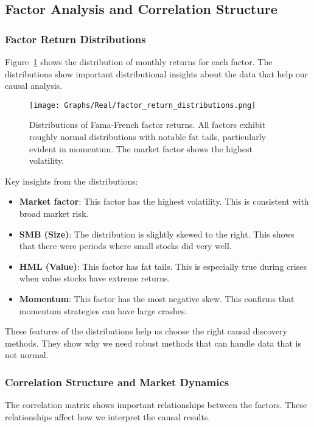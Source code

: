 \subsection{Factor Analysis and Correlation Structure}

\subsubsection{Factor Return Distributions}

Figure~\ref{fig:factor_dist_real} shows the distribution of monthly returns for each factor. The distributions show important distributional insights about the data that help our causal analysis.

\begin{figure}[ht]
\centering
\texttt{[image: Graphs/Real/factor\_return\_distributions.png]}
\caption{Distributions of Fama-French factor returns. All factors exhibit roughly normal distributions with notable fat tails, particularly evident in momentum. The market factor shows the highest volatility.}
\label{fig:factor_dist_real}
\end{figure}

Key insights from the distributions:
\begin{itemize}
    \item \textbf{Market factor}: This factor has the highest volatility. This is consistent with broad market risk.
    \item \textbf{SMB (Size)}: The distribution is slightly skewed to the right. This shows that there were periods where small stocks did very well.
    \item \textbf{HML (Value)}: This factor has fat tails. This is especially true during crises when value stocks have extreme returns.
    \item \textbf{Momentum}: This factor has the most negative skew. This confirms that momentum strategies can have large crashes.
\end{itemize}

These features of the distributions help us choose the right causal discovery methods. They show why we need robust methods that can handle data that is not normal.

\subsubsection{Correlation Structure and Market Dynamics}

The correlation matrix shows important relationships between the factors. These relationships affect how we interpret the causal results.

